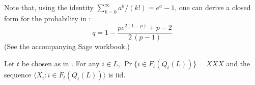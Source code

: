 \documentclass{patmorin}
\begin{document}
Note that, using the identity $\sum_{k=0}^\infty a^k/(k!)=e^a-1$, one can derive a closed form for the probability in :
\[
q = 
1-\frac{p e^{2(1-p)} + p - 2}{2 \, {\left(p - 1\right)}}
\]
(See the accompanying Sage workbook.)

\begin{lem}
  Let $t$ be chosen as in . For any $i\in L$, $\Pr\{i\in F_t(Q_t(L))\}= XXX$ and the sequence $\langle X_i:i\in F_t(Q_t(L))\rangle$ is iid.
\end{lem}


%
%
%
%
%
%
%
\end{document}
